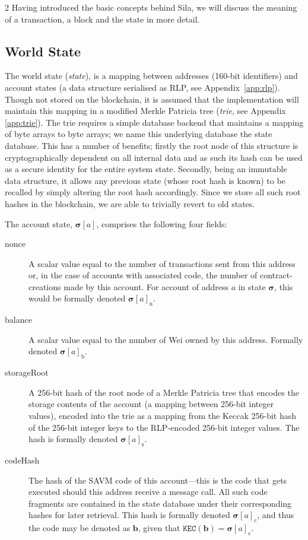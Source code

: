 \documentclass[9pt,oneside]{amsart}
\makeatletter
\newcommand{\linkdest}[1]{\Hy@raisedlink{\hypertarget{#1}{}}}
\makeatother
\begin{document}
\begin{multicols}{2}
Having introduced the basic concepts behind Sila, we will discuss the meaning of a transaction, a block and the state in more detail.

\subsection{World State} \label{ch:state}

The world state (\textit{state}), is a mapping between addresses (160-bit identifiers) and account states (a data structure serialised as RLP, see Appendix~\ref{app:rlp}). Though not stored on the blockchain, it is assumed that the implementation will maintain this mapping in a modified Merkle Patricia tree (\textit{trie}, see Appendix \ref{app:trie}). The trie requires a simple database backend that maintains a mapping of byte arrays to byte arrays; we name this underlying database the state database. This has a number of benefits; firstly the root node of this structure is cryptographically dependent on all internal data and as such its hash can be used as a secure identity for the entire system state. Secondly, being an immutable data structure, it allows any previous state (whose root hash is known) to be recalled by simply altering the root hash accordingly. Since we store all such root hashes in the blockchain, we are able to trivially revert to old states.

The account state, $\boldsymbol{\sigma}[a]$, comprises the following four fields:

\begin{description}
\item[nonce] \linkdest{account_nonce}A scalar value equal to the number of transactions sent from this address or, in the case of accounts with associated code, the number of contract-creations made by this account. For account of address $a$ in state $\boldsymbol{\sigma}$, this would be formally denoted $\boldsymbol{\sigma}[a]_{\mathrm{n}}$.
\item[balance] A scalar value equal to the number of Wei owned by this address. Formally denoted $\boldsymbol{\sigma}[a]_{\mathrm{b}}$.
\item[storageRoot] A 256-bit hash of the root node of a Merkle Patricia tree that encodes the storage contents of the account (a mapping between 256-bit integer values), encoded into the trie as a mapping from the Keccak 256-bit hash of the  256-bit integer keys to the RLP-encoded 256-bit integer values. The hash is formally denoted $\boldsymbol{\sigma}[a]_{\mathrm{s}}$.
\item[codeHash] The hash of the SAVM code of this account---this is the code that gets executed should this address receive a message call. All such code fragments are contained in the state database under their corresponding hashes for later retrieval. This hash is formally denoted $\boldsymbol{\sigma}[a]_{\mathrm{c}}$, and thus the code may be denoted as $\mathbf{b}$, given that $\texttt{KEC}(\mathbf{b}) = \boldsymbol{\sigma}[a]_{\mathrm{c}}$.
\end{description}


\end{multicols}
\end{document}
